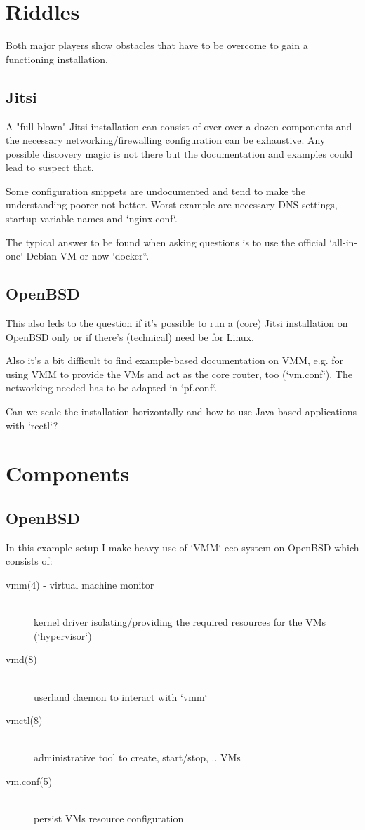 \documentclass[10pt,conference]{IEEEtran}
\begin{document}
\section{Riddles}
Both major players show obstacles that have to be overcome to gain a functioning installation.

\subsection{Jitsi}
A "full blown" Jitsi installation can consist of over over a dozen components and the
necessary networking/firewalling configuration can be exhaustive. Any possible discovery
magic is not there but the documentation and examples could lead to suspect that.

Some configuration snippets are undocumented and tend to make the understanding poorer
not better. Worst example are necessary DNS settings, startup variable names and `nginx.conf`.

The typical answer to be found when asking questions is to use the official `all-in-one`
Debian VM or now `docker``.

\subsection{OpenBSD}
This also leds to the question if it's possible to run a (core) Jitsi installation on
OpenBSD only or if there's (technical) need be for Linux.

Also it's a bit difficult to find example-based documentation on VMM, e.g. for using
VMM to provide the VMs and act as the core router, too (`vm.conf`). The networking needed
has to be adapted in `pf.conf`.

Can we scale the installation horizontally and how to use Java based applications
with `rcctl`?

\section{Components}
\subsection{OpenBSD}
In this example setup I make heavy use of `VMM` eco system on OpenBSD which consists of:
\begin{description}
\item[vmm(4) - virtual machine monitor] \hfill \\
	kernel driver isolating/providing the required resources for the VMs (`hypervisor`)
\item[vmd(8)] \hfill \\
	userland daemon to interact with `vmm`
\item[vmctl(8)]  \hfill \\
	administrative tool to create, start/stop, .. VMs
\item[vm.conf(5)]  \hfill \\
	persist VMs resource configuration
\end{description}
\end{document}
